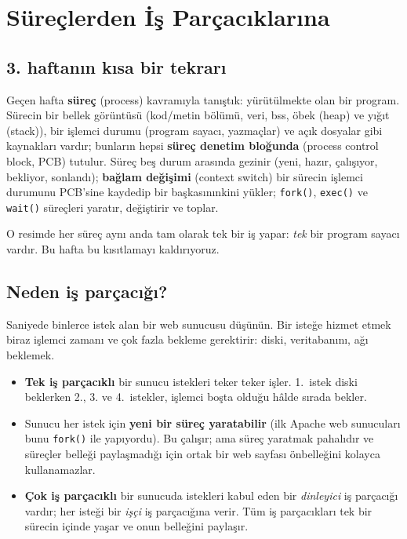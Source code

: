 \documentclass[11pt,a4paper]{article}
\newcommand{\term}[1]{\textbf{\color{mintdeep}#1}}
\newcommand{\cmd}[1]{\texttt{#1}}
\begin{document}
\setcounter{tocdepth}{2}
\tableofcontents

\section{Süreçlerden İş Parçacıklarına}

\subsection{3. haftanın kısa bir tekrarı}

Geçen hafta \term{süreç} (process) kavramıyla tanıştık: yürütülmekte olan bir program. Sürecin bir bellek görüntüsü (kod/metin bölümü, veri, bss, öbek (heap) ve yığıt (stack)), bir işlemci durumu (program sayacı, yazmaçlar) ve açık dosyalar gibi kaynakları vardır; bunların hepsi \term{süreç denetim bloğunda} (process control block, PCB) tutulur. Süreç beş durum arasında gezinir (yeni, hazır, çalışıyor, bekliyor, sonlandı); \term{bağlam değişimi} (context switch) bir sürecin işlemci durumunu PCB'sine kaydedip bir başkasınınkini yükler; \cmd{fork()}, \cmd{exec()} ve \cmd{wait()} süreçleri yaratır, değiştirir ve toplar.

O resimde her süreç aynı anda tam olarak tek bir iş yapar: \emph{tek} bir program sayacı vardır. Bu hafta bu kısıtlamayı kaldırıyoruz.

\subsection{Neden iş parçacığı?}

Saniyede binlerce istek alan bir web sunucusu düşünün. Bir isteğe hizmet etmek biraz işlemci zamanı ve çok fazla bekleme gerektirir: diski, veritabanını, ağı beklemek.

\begin{itemize}
  \item \textbf{Tek iş parçacıklı} bir sunucu istekleri teker teker işler. 1.~istek diski beklerken 2., 3. ve 4.~istekler, işlemci boşta olduğu hâlde sırada bekler.
  \item Sunucu her istek için \textbf{yeni bir süreç yaratabilir} (ilk Apache web sunucuları bunu \cmd{fork()} ile yapıyordu). Bu çalışır; ama süreç yaratmak pahalıdır ve süreçler belleği paylaşmadığı için ortak bir web sayfası önbelleğini kolayca kullanamazlar.
  \item \textbf{Çok iş parçacıklı} bir sunucuda istekleri kabul eden bir \emph{dinleyici} iş parçacığı vardır; her isteği bir \emph{işçi} iş parçacığına verir. Tüm iş parçacıkları tek bir sürecin içinde yaşar ve onun belleğini paylaşır.
\end{itemize}
\end{document}
